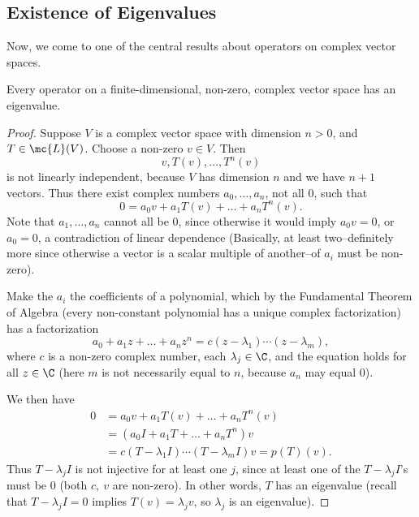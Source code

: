 \documentclass[math0540-lecture-notes.tex]{subfiles}
\begin{document}
\subsection{Existence of Eigenvalues}
Now, we come to one of the central results about operators on complex vector spaces.
\begin{theorem}{}
  Every operator on a finite-dimensional, non-zero, complex vector space has an eigenvalue.
\end{theorem}
\begin{proof}[Proof]
  Suppose $V$ is a complex vector space with dimension $n>0$, and $T\in \mc{L}(V)$. Choose a
  non-zero $v\in V$. Then \[
    v,T(v),\ldots,T^n(v)
  \] is not linearly independent, because $V$ has dimension $n$ and we have $n+1$ vectors. Thus
  there exist complex numbers $a_0,\ldots,a_n$, not all $0$, such that \[
    0=a_0v+a_1T(v)+\ldots+a_nT^n(v)
  .\] Note that $a_1,\ldots,a_n$ cannot all be $0$, since otherwise it would imply $a_0v=0$, or
  $a_0=0$, a contradiction of linear dependence (Basically, at least two--definitely more since
  otherwise a vector is a scalar multiple of another--of $a_i$ must be non-zero).

  Make the $a_i$ the coefficients of a polynomial, which by the Fundamental Theorem of Algebra
  (every non-constant polynomial has a unique complex factorization) has a factorization \[
    a_0+a_1z+\ldots+a_nz^n=c(z-\lambda_1)\cdots(z-\lambda_m)
  ,\] where $c$ is a non-zero complex number, each $\lambda_j\in \C$, and the equation holds for all
  $z\in \C$ (here $m$ is not necessarily equal to $n$, because $a_n$ may equal $0$).

  We then have
  \begin{align*}
    0&= a_0v+a_1T(v)+\ldots+a_nT^n(v) \\
     &= (a_0I+a_1T+\ldots+a_nT^n)v \\
     &= c(T-\lambda_1I)\cdots(T-\lambda_mI)v=p(T)(v)
  .\end{align*} Thus $T-\lambda_jI$ is not injective for at least one $j$, since at least one of the
  $T-\lambda_jI$'s must be $0$ (both $c,\ v$ are non-zero). In other words, $T$ has an eigenvalue
  (recall that $T-\lambda_jI=0$ implies $T(v)=\lambda_j v$, so $\lambda_j$ is an eigenvalue).
\end{proof}
\end{document}
